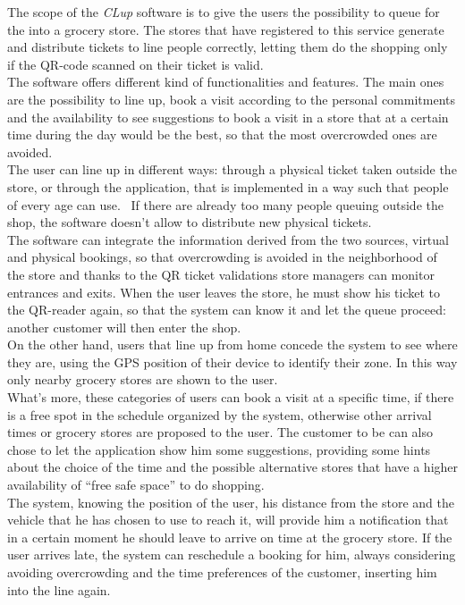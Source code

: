 \documentclass[]{article}
\begin{document}
				The scope of the \textit{CLup} software is to give the users the possibility to queue for the into a grocery store.
The stores that have registered to this service generate and distribute tickets to line people correctly, letting them do the shopping only if the QR-code scanned on their ticket is valid.\\
The software offers different kind of functionalities and features. The main ones are the possibility to line up, book a visit according to the personal commitments and the availability to see suggestions to book a visit in a store that at a certain time during the day would be the best, so that the most overcrowded ones are avoided.\\
			\newline
The user can line up in different ways: through a physical ticket taken outside the store, or through the application, that is implemented in a way such that people of every age can use. 
If there are already too many people queuing outside the shop, the software doesn’t allow to distribute new physical tickets. \\
The software can integrate the information derived from the two sources, virtual and physical bookings, so that overcrowding is avoided in the neighborhood of the store and thanks to the QR ticket validations store managers can monitor entrances and exits. When the user leaves the store, he must show his ticket to the QR-reader again, so that the system can know it and let the queue proceed: another customer will then enter the shop.\\
			\newline
On the other hand, users that line up from home concede the system to see where they are, using the GPS position of their device to identify their zone. In this way only nearby grocery stores are shown to the user.\\
What’s more, these categories of users can book a visit at a specific time, if there is a free spot in the schedule organized by the system, otherwise other arrival times or grocery stores are proposed to the user. The customer to be can also chose to let the application show him some suggestions, providing some hints about the choice of the time and the possible alternative stores that have a higher availability of “free safe space” to do shopping.\\
The system, knowing the position of the user, his distance from the store and the vehicle that he has chosen to use to reach it, will provide him a notification that in a certain moment he should leave to arrive on time at the grocery store. If the user arrives late, the system can reschedule a booking for him, always considering avoiding overcrowding and the time preferences of the customer, inserting him into the line again.\\
\end{document}

